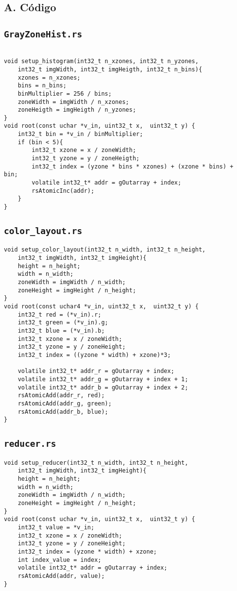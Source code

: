 \begin{Anexos}
\section*{A. Código}
\lstset{style=CInputStyle}
\subsection*{\texttt{GrayZoneHist.rs}}
\begin{lstlisting}

void setup_histogram(int32_t n_xzones, int32_t n_yzones,
    int32_t imgWidth, int32_t imgHeigth, int32_t n_bins){
    xzones = n_xzones;
    bins = n_bins;
    binMultiplier = 256 / bins;
    zoneWidth = imgWidth / n_xzones;
    zoneHeigth = imgHeigth / n_yzones;
}
void root(const uchar *v_in, uint32_t x,  uint32_t y) {
    int32_t bin = *v_in / binMultiplier;
    if (bin < 5){
        int32_t xzone = x / zoneWidth;
        int32_t yzone = y / zoneHeigth;
        int32_t index = (yzone * bins * xzones) + (xzone * bins) + bin;
        volatile int32_t* addr = gOutarray + index;
        rsAtomicInc(addr);
    }
}
\end{lstlisting}

\subsection*{\texttt{color\_layout.rs}}
\begin{lstlisting}
void setup_color_layout(int32_t n_width, int32_t n_height,
    int32_t imgWidth, int32_t imgHeight){
    height = n_height;
    width = n_width;
    zoneWidth = imgWidth / n_width;
    zoneHeight = imgHeight / n_height;
}
void root(const uchar4 *v_in, uint32_t x,  uint32_t y) {
    int32_t red = (*v_in).r;
    int32_t green = (*v_in).g;
    int32_t blue = (*v_in).b;
    int32_t xzone = x / zoneWidth;
    int32_t yzone = y / zoneHeight;
    int32_t index = ((yzone * width) + xzone)*3;

    volatile int32_t* addr_r = gOutarray + index;
    volatile int32_t* addr_g = gOutarray + index + 1;
    volatile int32_t* addr_b = gOutarray + index + 2;
    rsAtomicAdd(addr_r, red);
    rsAtomicAdd(addr_g, green);
    rsAtomicAdd(addr_b, blue);
}
\end{lstlisting}


\subsection*{\texttt{reducer.rs}}
\begin{lstlisting}
void setup_reducer(int32_t n_width, int32_t n_height,
    int32_t imgWidth, int32_t imgHeight){
    height = n_height;
    width = n_width;
    zoneWidth = imgWidth / n_width;
    zoneHeight = imgHeight / n_height;
}
void root(const uchar *v_in, uint32_t x,  uint32_t y) {
    int32_t value = *v_in;
    int32_t xzone = x / zoneWidth;
    int32_t yzone = y / zoneHeight;
    int32_t index = (yzone * width) + xzone;
    int index_value = index;
    volatile int32_t* addr = gOutarray + index;
    rsAtomicAdd(addr, value);
}
\end{lstlisting}


\end{Anexos}
